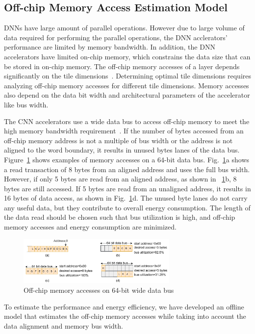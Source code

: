 \documentclass[a4paper,10pt]{article}
\begin{document}
\subsection{Off-chip Memory Access Estimation Model}\label{sec:OffChipAccessModel}
DNNs have large amount of parallel operations. However due to large volume of data required for performing the parallel operations, the DNN acclerators' performance are limited by memory bandwidth. In addition, the DNN accelerators have limited on-chip memory, which constrains the data size that can be stored in on-chip memory. The off-chip memory accesses of a layer depends significantly on the tile dimensions~\cite{zhang2015optimizing, Li2018SmartShuttleOO}. Determining optimal tile dimensions requires analyzing off-chip memory accesses for different tile dimensions. Memory accesses also depend on the data bit width and architectural parameters of the accelerator like bus width. 

The CNN accelerators use a wide data bus to access off-chip memory to meet the high memory bandwidth requirement~\cite{Chen2016EyerissAS,chen2014diannao}. If the number of bytes accessed from an off-chip memory address is not a multiple of bus width or the address is not aligned to the word boundary, it results in unused bytes lanes of the data bus. Figure~\ref{fig:AXI_AccesseOn64BitDataBus} shows examples of memory accesses on a 64-bit data bus.  Fig.~\ref{fig:AXI_AccesseOn64BitDataBus}a shows a read transaction of 8 bytes from an aligned address and uses the full bus width. However, if only 5 bytes are read from an aligned address, as shown in \figurename~\ref{fig:AXI_AccesseOn64BitDataBus}b, 8 bytes are still accessed. If 5 bytes are read from an unaligned address, it results in 16 bytes of data access, as shown in Fig.~\ref{fig:AXI_AccesseOn64BitDataBus}d. The unused byte lanes do not carry any useful data, but they contribute to overall energy consumption. The length of the data read should be chosen such that bus utilization is high, and off-chip memory accesses and energy consumption are minimized.
\begin{figure}[!htb]
	\centering
	\includegraphics[width=0.7\textwidth]{./images/BurstTranscationOnAXI}
	\caption{Off-chip memory accesses on 64-bit wide data bus}
	\label{fig:AXI_AccesseOn64BitDataBus}
\end{figure}
To estimate the performance and energy efficiency, we have developed an offline model that estimates the off-chip memory accesses while taking into account the data alignment and memory bus width.
\end{document}
